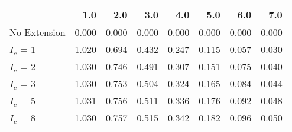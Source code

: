 \begin{tabular}{lrrrrrrr}
\toprule
{} &   1.0 &   2.0 &   3.0 &   4.0 &   5.0 &   6.0 &   7.0 \\
\midrule
No Extension & 0.000 & 0.000 & 0.000 & 0.000 & 0.000 & 0.000 & 0.000 \\
$I_c$ = 1    & 1.020 & 0.694 & 0.432 & 0.247 & 0.115 & 0.057 & 0.030 \\
$I_c$ = 2    & 1.030 & 0.746 & 0.491 & 0.307 & 0.151 & 0.075 & 0.040 \\
$I_c$ = 3    & 1.030 & 0.753 & 0.504 & 0.324 & 0.165 & 0.084 & 0.044 \\
$I_c$ = 5    & 1.031 & 0.756 & 0.511 & 0.336 & 0.176 & 0.092 & 0.048 \\
$I_c$ = 8    & 1.030 & 0.757 & 0.515 & 0.342 & 0.182 & 0.096 & 0.050 \\
\bottomrule
\end{tabular}
